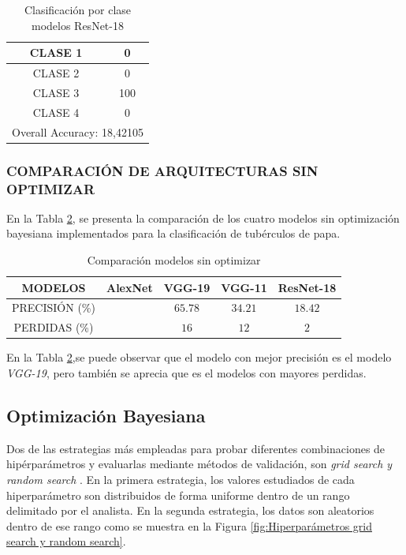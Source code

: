 		\begin{table}[htbp]
		\centering
		\begin{tabular}{|c|c|}
			\hline
			CLASE 1 & 0 \bigstrut\\
			\hline
			CLASE 2 & 0 \bigstrut\\
			\hline
			CLASE 3 & 100 \bigstrut\\
			\hline
			CLASE 4 & 0 \bigstrut\\
			\hline
			\multicolumn{2}{|c|}{Overall Accuracy: 18,42105} \bigstrut\\
			\hline
		\end{tabular}%
		\caption{Clasificación por clase modelos ResNet-18}
		\label{clase_RESNET18}
	\end{table}%


	\newpage	
	\subsubsection{\MakeUppercase{Comparación de arquitecturas sin optimizar}}
	En la Tabla \ref{table:compasin}, se presenta la comparación de los cuatro modelos sin optimización bayesiana implementados para la clasificación de tubérculos de papa.
	
	\begin{table}[ht]
		\centering
		\begin{tabular}{|c|c|c|c|c|}
			\hline
			MODELOS & AlexNet & VGG-19 & VGG-11 & ResNet-18 \\
			\hline
			PRECISIÓN (\%) &  & $$65.78$$ & $$34.21$$ & $$18.42$$ \\
			\hline
			PERDIDAS (\%) &  & $$16$$ & $$12$$ & $$2$$ \\
			\hline
		\end{tabular}	
		\caption{Comparación modelos sin optimizar}
		\label{table:compasin}
	\end{table}	
	
	En la Tabla \ref{table:compasin},se puede observar que el modelo con mejor precisión es el modelo \textit{VGG-19}, pero también se aprecia que es el modelos con mayores perdidas.

			
	\newpage
	\subsection{Optimización Bayesiana}
	
	Dos de las estrategias más empleadas para probar diferentes combinaciones de hipérparámetros y evaluarlas mediante métodos de validación, son \textit{grid search y random search} \cite{liashchynskyi2019grid}. En la primera estrategia, los valores estudiados de cada hiperparámetro son distribuidos de forma uniforme dentro de un rango delimitado por el analista. En la segunda estrategia, los datos son aleatorios dentro de ese rango como se muestra en la Figura \ref{fig:Hiperparámetros grid search y random search}.
	
